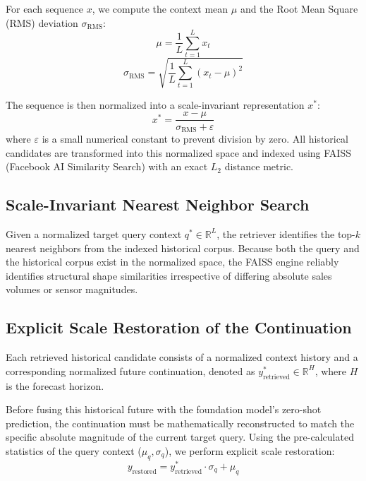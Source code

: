 \documentclass[twocolumn]{svjour3}          %
\begin{document}
For each sequence $x$, we compute the context mean $\mu$ and the Root Mean Square (RMS) deviation $\sigma_{\text{RMS}}$:
\begin{equation}
\mu = \frac{1}{L}\sum_{t=1}^{L}x_t
\end{equation}
\begin{equation}
\sigma_{\text{RMS}} = \sqrt{\frac{1}{L}\sum_{t=1}^{L}(x_t-\mu)^2}
\end{equation}

The sequence is then normalized into a scale-invariant representation $x^*$:
\begin{equation}
x^* = \frac{x-\mu}{\sigma_{\text{RMS}} + \varepsilon}
\end{equation}
where $\varepsilon$ is a small numerical constant to prevent division by zero. All historical candidates are transformed into this normalized space and indexed using FAISS (Facebook AI Similarity Search) with an exact $L_2$ distance metric.

\subsection{Scale-Invariant Nearest Neighbor Search}
Given a normalized target query context $q^* \in \mathbb{R}^L$, the retriever identifies the top-$k$ nearest neighbors from the indexed historical corpus. Because both the query and the historical corpus exist in the normalized space, the FAISS engine reliably identifies structural shape similarities irrespective of differing absolute sales volumes or sensor magnitudes.

\subsection{Explicit Scale Restoration of the Continuation}
Each retrieved historical candidate consists of a normalized context history and a corresponding normalized future continuation, denoted as $y^*_{\text{retrieved}} \in \mathbb{R}^H$, where $H$ is the forecast horizon.

Before fusing this historical future with the foundation model's zero-shot prediction, the continuation must be mathematically reconstructed to match the specific absolute magnitude of the current target query. Using the pre-calculated statistics of the query context ($\mu_q, \sigma_q$), we perform explicit scale restoration:
\begin{equation}
y_{\text{restored}} = y^*_{\text{retrieved}} \cdot \sigma_q + \mu_q
\end{equation}
\end{document}
